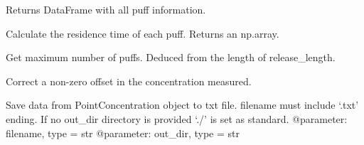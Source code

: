 \documentclass[letterpaper,10pt,english]{sphinxmanual}
\begin{document}
\begin{fulllineitems}
\begin{fulllineitems}
\label{\detokenize{index:windtunnel.PuffConcentration.get_puff_statistics}}
Returns DataFrame with all puff information.

\end{fulllineitems}


\begin{fulllineitems}
\label{\detokenize{index:windtunnel.PuffConcentration.get_residence_time}}
Calculate the residence time of each puff. Returns an np.array.

\end{fulllineitems}


\begin{fulllineitems}
\label{\detokenize{index:windtunnel.PuffConcentration.max_puffs}}
Get maximum number of puffs. Deduced from the length of 
release\_length.

\end{fulllineitems}


\begin{fulllineitems}
\label{\detokenize{index:windtunnel.PuffConcentration.offset_correction}}
Correct a non-zero offset in the concentration measured.

\end{fulllineitems}


\begin{fulllineitems}
\label{\detokenize{index:windtunnel.PuffConcentration.save2file}}
Save data from PointConcentration object to txt file. filename must
include ‘.txt’ ending. If no out\_dir directory is provided ‘./’ is set 
as standard.
@parameter: filename, type = str
@parameter: out\_dir, type = str

\end{fulllineitems}


\end{fulllineitems}
\end{document}
